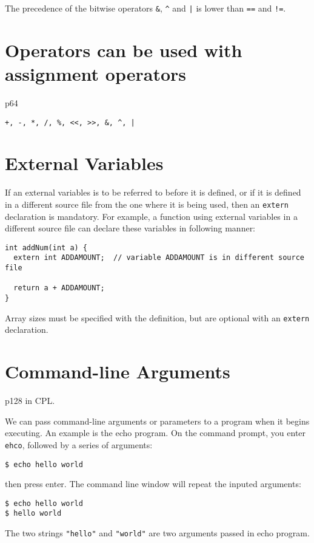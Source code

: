 \documentclass[12pt]{article}
\begin{document}
The precedence of the bitwise operators \texttt{\&}, \texttt{\textasciicircum{}} and \texttt{|} is lower than \texttt{==} and \texttt{!=}.
\section{Operators can be used with assignment operators}
\label{sec:orgfd28329}
p64

\texttt{+, -, *, /, \%, <<, >>, \&, \textasciicircum{}, |}
\section{External Variables}
\label{sec:org96f509d}
If an external variables is to be referred to before it is defined, or if it is defined in a different source file from the one where it is being used, then an \texttt{extern} declaration is mandatory. For example, a function using external variables in a different source file can declare these variables in following manner:
\begin{verbatim}
int addNum(int a) {
  extern int ADDAMOUNT;  // variable ADDAMOUNT is in different source file

  return a + ADDAMOUNT;
}
\end{verbatim}
Array sizes must be specified with the definition, but are optional with an \texttt{extern} declaration.
\section{Command-line Arguments}
\label{sec:org685786e}
p128 in CPL.

We can pass command-line arguments or parameters to a program when it begins executing. An example is the echo program. On the command prompt, you enter \texttt{ehco}, followed by a series of arguments:
\begin{verbatim}
$ echo hello world
\end{verbatim}
then press enter. The command line window will repeat the inputed arguments:
\begin{verbatim}
$ echo hello world
$ hello world
\end{verbatim}
The two strings \texttt{"hello"} and \texttt{"world"} are two arguments passed in echo program.
\end{document}
